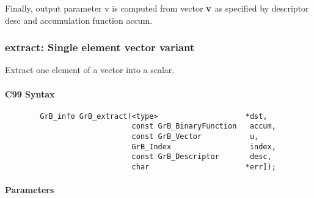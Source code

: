 Finally, output parameter {\sf v} is computed from vector ${\bf v}$ as
specified by descriptor {\sf desc} and accumulation function {\sf accum}.

\subsubsection{{\sf extract}: Single element vector variant}
\label{Sec:extract_single_element_vec}

Extract one element of a vector into a scalar. 

\paragraph{C99 Syntax}

\begin{verbatim}
        GrB_info GrB_extract(<type>                    *dst,
                             const GrB_BinaryFunction   accum,
                             const GrB_Vector           u,
                             GrB_Index                  index,
                             const GrB_Descriptor       desc,
                             char                      *err]); 
\end{verbatim}

\paragraph{Parameters}

